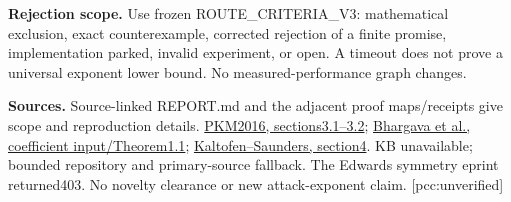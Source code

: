 \documentclass[10pt]{article}
\begin{document}
\textbf{Rejection scope.} Use frozen ROUTE\_CRITERIA\_V3: mathematical
exclusion, exact counterexample, corrected rejection of a finite promise,
implementation parked, invalid experiment, or open. A timeout does not prove
a universal exponent lower bound. No measured-performance graph changes.

\textbf{Sources.} Source-linked REPORT.md and the adjacent proof maps/receipts
give scope and reproduction details.
\href{https://people.maths.ox.ac.uk/petit/files/16PKC_primeECDLP.pdf}{PKM2016, sections3.1--3.2};
\href{https://arxiv.org/html/2205.00342v1}{Bhargava et al., coefficient input/Theorem1.1};
\href{https://users.cs.duke.edu/~elk27/bibliography/91/KaSa91.pdf}{Kaltofen--Saunders, section4}.
KB unavailable; bounded repository and primary-source fallback. The Edwards
symmetry eprint returned403. No novelty clearance or new attack-exponent claim.
[pcc:unverified]
\end{document}
